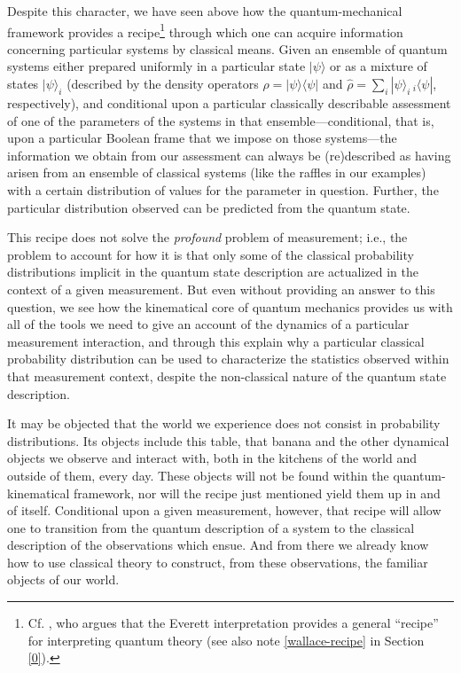 Despite this character, we have seen above how the quantum-mechanical framework provides a recipe\footnote{Cf. \citet[]{Wallace 2019}, who argues that the Everett interpretation provides a general ``recipe'' for interpreting quantum theory (see also note \ref{wallace-recipe} in Section \ref{0}).} through which one can acquire information concerning particular systems by classical means. Given an ensemble of quantum systems either prepared uniformly in a particular state $| \psi \rangle$ or as a mixture of states $| \psi \rangle_i$ (described by the density operators $\hat{\rho} = | \psi \rangle\langle \psi |$ and $\hat{\rho} = \sum_i| \psi \rangle_{\!i} \, _{i\!}\langle \psi |$, respectively), and conditional upon a particular classically describable assessment of one of the parameters of the systems in that ensemble---conditional, that is, upon a particular Boolean frame that we impose on those systems---the information we obtain from our assessment can always be (re)described as having arisen from an ensemble of classical systems (like the raffles in our examples) with a certain distribution of values for the parameter in question. Further, the particular distribution observed can be predicted from the quantum state.

This recipe does not solve the \emph{profound} problem of measurement; i.e., the problem to account for how it is that only some of the classical probability distributions implicit in the quantum state description are actualized in the context of a given measurement. But even without providing an answer to this question, we see how the kinematical core of quantum mechanics provides us with all of the tools we need to give an account of the dynamics of a particular measurement interaction, and through this explain why a particular classical probability distribution can be used to characterize the statistics observed within that measurement context, despite the non-classical nature of the quantum state description.

It may be objected that the world we experience does not consist in probability distributions. Its objects include this table, that banana and the other dynamical objects we observe and interact with, both in the kitchens of the world and outside of them, every day. These objects will not be found within the quantum-kinematical framework, nor will the recipe just mentioned yield them up in and of itself. Conditional upon a given measurement, however, that recipe will allow one to transition from the quantum description of a system to the classical description of the observations which ensue. And from there we already know how to use classical theory to construct, from these observations, the familiar objects of our world.

